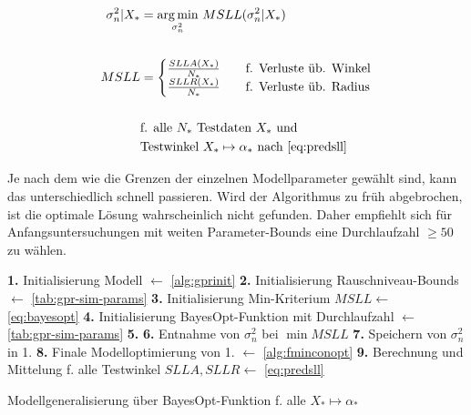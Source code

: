 \begin{align}\label{eq:bayesopt}
	\sigma_n^2|X_* &= \underset{\sigma_n^2}{\arg\min} \text{ } MSLL(\sigma_n^2|X_*) \nonumber \\
	\\
	MSLL &= 
		\begin{cases}
			\frac{SLLA(X_*)}{N_*} &\quad \text{f. Verluste üb. Winkel} \\
			\frac{SLLR(X_*)}{N_*} &\quad \text{f. Verluste üb. Radius}
		\end{cases}
\nonumber \\
\nonumber \\
& \text{f. alle } N_* \text{ Testdaten } X_* \text{ und} \nonumber \\
& \text{Testwinkel } X_* \mapsto \alpha_* \text{  nach \autoref{eq:predsll}}\nonumber
\end{align}


\clearpage


Je nach dem wie die Grenzen der einzelnen Modellparameter gewählt sind, kann das unterschiedlich schnell passieren. Wird der Algorithmus zu früh abgebrochen, ist die optimale Lösung wahrscheinlich nicht gefunden. Daher empfiehlt sich für Anfangsuntersuchungen mit weiten Parameter-Bounds eine Durchlaufzahl $\ge 50$ zu wählen.


\begin{algorithm}[htp]
	\SetAlgoLined
	\textbf{1.} Initialisierung Modell $\leftarrow$ \autoref{alg:gprinit}\;
	\textbf{2.} Initialisierung Rauschniveau-Bounds $\leftarrow$ \autoref{tab:gpr-sim-params}\;
	\textbf{3.} Initialisierung Min-Kriterium $MSLL \leftarrow$ \autoref{eq:bayesopt}\;
	\textbf{4.} Initialisierung BayesOpt-Funktion mit Durchlaufzahl $\leftarrow$ \autoref{tab:gpr-sim-params}\;
	\textbf{5.} 
	\textbf{6.} Entnahme von $\sigma_n^2$ bei $\min MSLL$\;
	\textbf{7.} Speichern von $\sigma_n^2$ in 1.\;
	\textbf{8.} Finale Modelloptimierung von 1. $\leftarrow$ \autoref{alg:fminconopt}\;
	\textbf{9.} Berechnung und Mittelung f. alle Testwinkel $SLLA, SLLR \leftarrow$ \autoref{eq:predsll}\;
	\caption{Modellgeneralisierung über BayesOpt-Funktion f. alle $X_* \mapsto \alpha_*$}
	\label{alg:bayesopt}
\end{algorithm}





